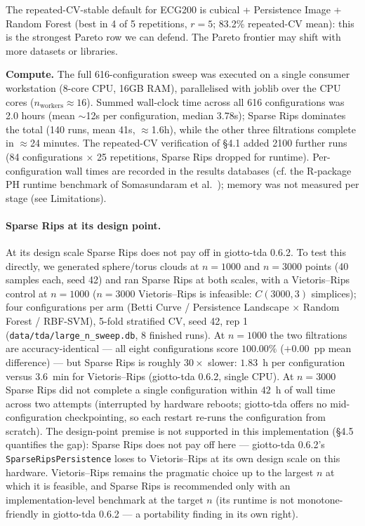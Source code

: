 \documentclass[12pt, a4paper]{report}
\theoremstyle{definition}
\theoremstyle{plain}
\theoremstyle{remark}
\begin{document}
The repeated-CV-stable default for ECG200 is cubical + Persistence
Image + Random Forest (best in 4 of 5 repetitions, $r{=}5$; 83.2\% repeated-CV
mean): this is the strongest Pareto row we can defend. The Pareto frontier may shift
with more datasets or libraries.

\textbf{Compute.} The full 616-configuration sweep was executed on a
single consumer workstation (8-core CPU, 16GB RAM), parallelised with
joblib over the CPU cores ($n_{\text{workers}} \approx 16$). Summed wall-clock time across all 616
configurations was 2.0 hours (mean $\sim$12s per configuration,
median 3.78s); Sparse Rips dominates the total (140 runs, mean 41s,
$\approx$1.6h), while the other three filtrations complete in
$\approx$24 minutes. The repeated-CV verification of \S4.1 added
2100 further runs (84 configurations $\times$ 25 repetitions,
Sparse Rips dropped for runtime). Per-configuration wall times
are recorded in the results databases (cf. the R-package PH runtime
benchmark of Somasundaram et al.\ \cite{somasundaram2021}); memory
was not measured per stage (see Limitations).

\paragraph{Sparse Rips at its design point.} At its design scale Sparse Rips does not pay off in giotto-tda 0.6.2. To test this
directly, we generated sphere/torus clouds at $n{=}1000$ and
$n{=}3000$ points (40 samples each, seed 42) and ran Sparse Rips at
both scales, with a Vietoris--Rips control at $n{=}1000$
($n{=}3000$ Vietoris--Rips is infeasible: $C(3000,3)$ simplices);
four configurations per arm (Betti Curve / Persistence Landscape
$\times$ Random Forest / RBF-SVM), 5-fold stratified CV, seed 42,
rep 1 (\texttt{data/tda/large\_n\_sweep.db}\allowbreak, 8 finished runs). At
$n{=}1000$ the two filtrations are accuracy-identical --- all eight
configurations score $100.00\%$ ($+0.00$~pp mean difference) --- but
Sparse Rips is roughly $30\times$ slower: $1.83$~h per configuration
versus $3.6$~min for Vietoris--Rips (giotto-tda 0.6.2, single CPU).
At $n{=}3000$ Sparse Rips did not complete a single configuration
within $42$~h of wall time across two attempts (interrupted by
hardware reboots; giotto-tda offers no mid-configuration
checkpointing, so each restart re-runs the configuration from
scratch). The design-point premise is not supported in
this implementation (\S4.5 quantifies the gap): Sparse Rips does not
pay off here --- giotto-tda 0.6.2's \texttt{SparseRipsPersistence}
loses to Vietoris--Rips at its own design scale on this hardware. Vietoris--Rips
remains the pragmatic choice up to the largest $n$ at which it is
feasible, and Sparse Rips is recommended only with an
implementation-level benchmark at the target $n$ (its runtime is not
monotone-friendly in giotto-tda 0.6.2 --- a portability finding in
its own right).
\end{document}
